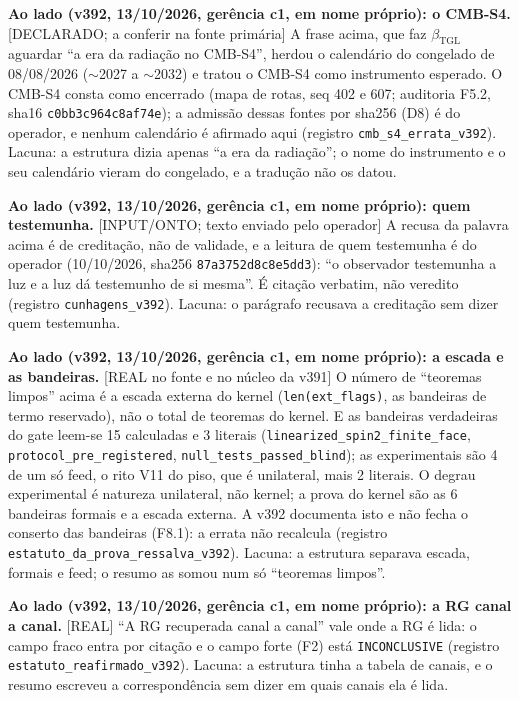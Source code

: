 \documentclass[11pt]{article}
\theoremstyle{definition}\newtheorem{deriv}{Derivação}
\begin{document}
\textbf{Ao lado (v392, 13/10/2026, gerência c1, em nome próprio): o CMB-S4.} \textsf{[DECLARADO; a conferir na fonte primária]} A frase acima, que faz $\beta_{\mathrm{TGL}}$ aguardar ``a era da radiação no CMB-S4'', herdou o calendário do congelado de 08/08/2026 ($\sim$2027 a $\sim$2032) e tratou o CMB-S4 como instrumento esperado. O CMB-S4 consta como encerrado (mapa de rotas, seq 402 e 607; auditoria F5.2, sha16 \texttt{c0bb3c964c8af74e}); a admissão dessas fontes por sha256 (D8) é do operador, e nenhum calendário é afirmado aqui (registro \texttt{cmb\_s4\_errata\_v392}). Lacuna: a estrutura dizia apenas ``a era da radiação''; o nome do instrumento e o seu calendário vieram do congelado, e a tradução não os datou.

\textbf{Ao lado (v392, 13/10/2026, gerência c1, em nome próprio): quem testemunha.} \textsf{[INPUT/ONTO; texto enviado pelo operador]} A recusa da palavra acima é de creditação, não de validade, e a leitura de quem testemunha é do operador (10/10/2026, sha256 \texttt{87a3752d8c8e5dd3}): ``o observador testemunha a luz e a luz dá testemunho de si mesma''. É citação verbatim, não veredito (registro \texttt{cunhagens\_v392}). Lacuna: o parágrafo recusava a creditação sem dizer quem testemunha.

\textbf{Ao lado (v392, 13/10/2026, gerência c1, em nome próprio): a escada e as bandeiras.} \textsf{[REAL no fonte e no núcleo da v391]} O número de ``teoremas limpos'' acima é a escada externa do kernel (\texttt{len(ext\_flags)}, as bandeiras de termo reservado), não o total de teoremas do kernel. E as bandeiras verdadeiras do gate leem-se 15 calculadas e 3 literais (\texttt{linearized\_spin2\_finite\_face}, \texttt{protocol\_pre\_registered}, \texttt{null\_tests\_passed\_blind}); as experimentais são 4 de um só feed, o rito V11 do piso, que é unilateral, mais 2 literais. O degrau experimental é natureza unilateral, não kernel; a prova do kernel são as 6 bandeiras formais e a escada externa. A v392 documenta isto e não fecha o conserto das bandeiras (F8.1): a errata não recalcula (registro \texttt{estatuto\_da\_prova\_ressalva\_v392}). Lacuna: a estrutura separava escada, formais e feed; o resumo as somou num só ``teoremas limpos''.

\textbf{Ao lado (v392, 13/10/2026, gerência c1, em nome próprio): a RG canal a canal.} \textsf{[REAL]} ``A RG recuperada canal a canal'' vale onde a RG é lida: o campo fraco entra por citação e o campo forte (F2) está \texttt{INCONCLUSIVE} (registro \texttt{estatuto\_reafirmado\_v392}). Lacuna: a estrutura tinha a tabela de canais, e o resumo escreveu a correspondência sem dizer em quais canais ela é lida.
\end{document}
